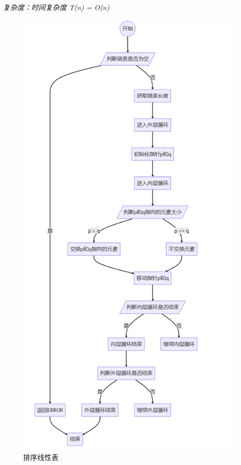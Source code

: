 \documentclass[supercite]{Experimental_Report}
\theoremstyle{definition}
\begin{document}
\begin{enumerate}
	\emph{复杂度：时间复杂度 T(n) = O(n)}
\begin{figure}[H]
	\centering
	\begin{minipage}{0.7\linewidth}
		\centering
		\includegraphics[width=0.9\linewidth]{images/排序表.png}
	\end{minipage}
	\caption{排序线性表}
	\label{fig1-3}
\end{figure}



\end{enumerate}
\end{document}

